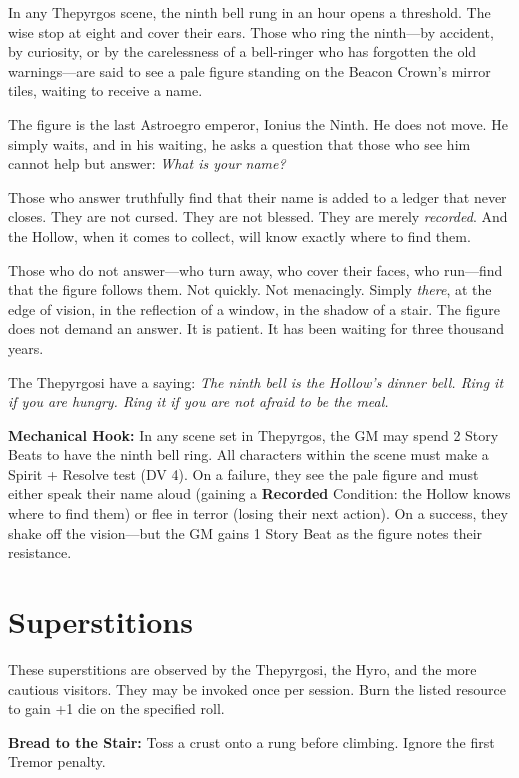 \documentclass[10pt,twocolumn]{book}
\begin{document}
In any Thepyrgos scene, the ninth bell rung in an hour opens a threshold. The wise stop at eight and cover their ears. Those who ring the ninth---by accident, by curiosity, or by the carelessness of a bell-ringer who has forgotten the old warnings---are said to see a pale figure standing on the Beacon Crown's mirror tiles, waiting to receive a name.

The figure is the last Astroegro emperor, Ionius the Ninth. He does not move. He simply waits, and in his waiting, he asks a question that those who see him cannot help but answer: \textit{What is your name?}

Those who answer truthfully find that their name is added to a ledger that never closes. They are not cursed. They are not blessed. They are merely \textit{recorded}. And the Hollow, when it comes to collect, will know exactly where to find them.

Those who do not answer---who turn away, who cover their faces, who run---find that the figure follows them. Not quickly. Not menacingly. Simply \textit{there}, at the edge of vision, in the reflection of a window, in the shadow of a stair. The figure does not demand an answer. It is patient. It has been waiting for three thousand years.

The Thepyrgosi have a saying: \textit{The ninth bell is the Hollow's dinner bell. Ring it if you are hungry. Ring it if you are not afraid to be the meal.}

\textbf{Mechanical Hook:} In any scene set in Thepyrgos, the GM may spend 2 Story Beats to have the ninth bell ring. All characters within the scene must make a Spirit + Resolve test (DV 4). On a failure, they see the pale figure and must either speak their name aloud (gaining a \textbf{Recorded} Condition: the Hollow knows where to find them) or flee in terror (losing their next action). On a success, they shake off the vision---but the GM gains 1 Story Beat as the figure notes their resistance.

\chapter{Superstitions}

These superstitions are observed by the Thepyrgosi, the Hyro, and the more cautious visitors. They may be invoked once per session. Burn the listed resource to gain +1 die on the specified roll.

\noindent\textbf{Bread to the Stair:} Toss a crust onto a rung before climbing. Ignore the first Tremor penalty.
\end{document}

